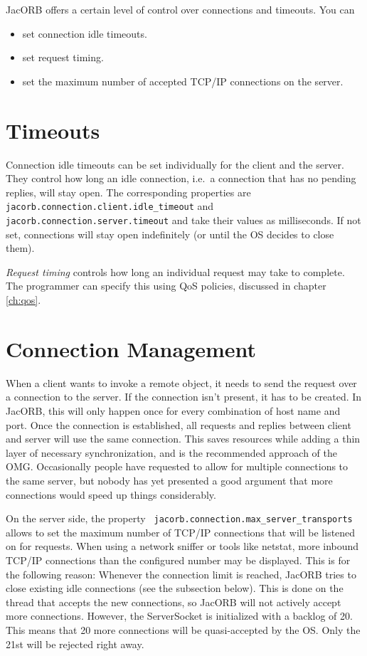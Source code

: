 
JacORB offers a certain level of control over connections and timeouts. You
can
\begin{itemize}
\item set connection idle timeouts.
\item set request timing.
\item set the maximum number of accepted TCP/IP connections on the server.
\end{itemize}

\section{Timeouts}
\label{connection_timeouts}
Connection idle timeouts can be set individually for the client and the
server. They control how long an idle connection, i.e.~a connection that has
no pending replies, will stay open. The corresponding properties are {\tt
  jacorb.connection.client.idle\_timeout} and {\tt
  jacorb.connection.server.timeout} and take their values as milliseconds. If
not set, connections will stay open indefinitely (or until the OS decides to
close them).

\emph{Request timing} controls how long an individual request may take to
complete.  The programmer can specify this using QoS policies,
discussed in chapter \ref{ch:qos}.

\section{Connection Management}
\label{connection_management}

When a client wants to invoke a remote object, it needs to send the request
over a connection to the server. If the connection isn't present, it has to be
created. In JacORB, this will only happen once for every combination of host
name and port. Once the connection is established, all requests and replies
between client and server will use the same connection. This saves resources
while adding a thin layer of necessary synchronization, and is the recommended
approach of the OMG. Occasionally people have requested to allow for multiple
connections to the same server, but nobody has yet presented a good argument
that more connections would speed up things considerably.

On the server side, the property {\tt
  jacorb.connection.max\_server\_transports} allows to set the maximum number
of TCP/IP connections that will be listened on for requests. When using a
network sniffer or tools like netstat, more inbound TCP/IP connections than
the configured number may be displayed. This is for the following reason:
Whenever the connection limit is reached, JacORB tries to close existing idle
connections (see the subsection below). This is done on the thread
that accepts the new connections, so JacORB will not actively accept more
connections. However, the ServerSocket is initialized with a backlog of 20.
This means that 20 more connections will be quasi-accepted by the OS. Only the
21st will be rejected right away.

